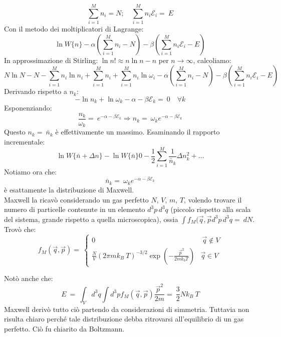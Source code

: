 \documentclass[12pt]{article}
\begin{document}
\[
\sum_{i=1}^M n_i = N; \quad \sum_{i=1}^M n_i \mathcal{E}_i =\ E
\]
Con il metodo dei moltiplicatori di Lagrange:
\[
\ln W\{n\} -\alpha \left(\sum_{i=1}^M n_i - N \right) -\beta\left(\sum_{i=1}^M n_i \mathcal{E}_i - E\right)
\]
In approssimazione di Stirling: $\ln n! \approx n\ln n - n$ per $n\to \infty$, calcoliamo:
\[
N\ln N-N -\sum_{i=1}^M n_i \ln n_i + \sum_{i=1}^M n_i + \sum_{i=1}^M n_i \ln \omega_i -\alpha \left(\sum_{i=1}^M n_i - N\right ) -\beta\left(\sum_{i=1}^M n_i \mathcal{E}_i - E\right)
\]
Derivando rispetto a $n_k$:
\[
-\ln n_k +\ln \omega_k - \alpha - \beta\mathcal{E}_k =\ 0 \quad \forall k
\]
Esponenziando:
\[
\frac{n_k}{\omega_k} =\ e^{-\alpha -\beta\mathcal{E}_k} \Rightarrow n_k =\ \omega_k e^{-\alpha -\beta \mathcal{E}_k}
\]
Questo $n_k =\ \bar{n}_k$ è effettivamente un massimo. Esaminando il rapporto incrementale:
\[
\ln W\{\bar{n}+\Delta n\}-\ln W\{\bar{n}\} 0 -\frac{1}{2} \sum_{i=1}^M \frac{1}{\bar{n}_k} \Delta n_k^2 + \dots
\]
Notiamo ora che:
\begin{equation}
\bar{n}_k =\ \omega_k e^{-\alpha -\beta \mathcal{E}_k}
\label{eqn:Maxwell}
\end{equation}
è esattamente la distribuzione di Maxwell.\\
Maxwell la ricavò considerando un gas perfetto $N$, $V$, $m$, $T$, volendo trovare il numero di particelle contenute in un elemento $d^3 p\, d^3 q$ (piccolo rispetto alla scala del sistema, grande rispetto a quella microscopica), ossia $\int f_M(\vec{q}, \vec{p} d^3 p\, d^3 q =\ dN$. Trovò che:
\[
f_M(\vec{q}, \vec{p}) =\ \begin{cases}
0 &\ \vec{q}\notin V\\
\frac{N}{V} {(2\pi mk_B\ T)^{-3/2}} \exp{\left (-\frac{\vec{p}^2}{2mk_b T}\right )} & \vec{q} \in V
\end{cases}
\]

Notò anche che:
\[
E\ =\ \int_V d^3 q \int d^3 p f_M(\vec{q}, \vec{p}) \frac{\vec{p}^2}{2m} =\ \frac{3}{2} N k_B\ T
\]
Maxwell derivò tutto ciò partendo da considerazioni di simmetria. Tuttavia non risulta chiaro perché tale distribuzione debba ritrovarsi all'equilibrio di un gas perfetto. Ciò fu chiarito da Boltzmann.\\
\end{document}
